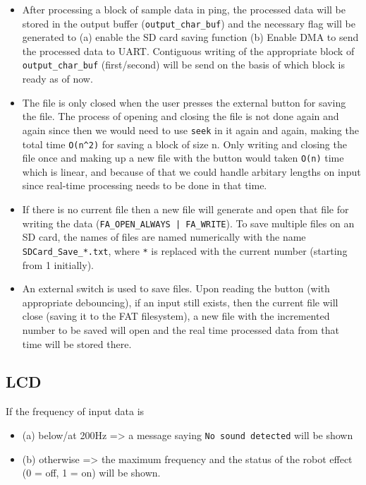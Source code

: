 \documentclass[11pt]{article}
\begin{document}
\begin{itemize}
\item After processing a block of sample data in ping, the processed data will be stored in the output buffer (\texttt{output\_char\_buf}) and the necessary flag will be generated to (a) enable the SD card saving function (b) Enable DMA to send the processed data to UART. Contiguous writing of the appropriate block of \texttt{output\_char\_buf} (first/second) will be send on the basis of which block is ready as of now.

\item The file is only closed when the user presses the external button for saving the file. The process of opening and closing the file is not done again and again since then we would need to use \texttt{seek} in it again and again, making the total time \texttt{O(n\textasciicircum{}2)} for saving a block of size n. Only writing and closing the file once and making up a new file with the button would taken \texttt{O(n)} time which is linear, and because of that we could handle arbitary lengths on input since real-time processing needs to be done in that time.

\item If there is no current file then a new file will generate and open that file for writing the data (\texttt{FA\_OPEN\_ALWAYS | FA\_WRITE}). To save multiple files on an SD card, the names of files are named numerically with the name \texttt{SDCard\_Save\_*.txt}, where \texttt{*} is replaced with the current number (starting from 1 initially).

\item An external switch is used to save files. Upon reading the button (with appropriate debouncing), if an input still exists, then the current file will close (saving it to the FAT filesystem), a new file with the incremented number to be saved will open and the real time processed data from that time will be stored there.
\end{itemize}


\subsection{LCD}
\label{sec:org1dcd843}

If the frequency of input data is
\begin{itemize}
\item (a) below/at 200Hz => a message saying \texttt{No sound detected} will be shown
\item (b) otherwise => the maximum frequency and the status of the robot effect (0 = off, 1 = on) will be shown.
\end{itemize}
\end{document}
